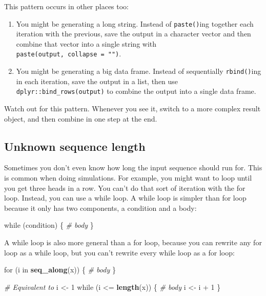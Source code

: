 \documentclass[]{book}
\newenvironment{Shaded}{\begin{snugshade}}{\end{snugshade}}
\newcommand{\KeywordTok}[1]{\textcolor[rgb]{0.13,0.29,0.53}{\textbf{{#1}}}}
\newcommand{\DecValTok}[1]{\textcolor[rgb]{0.00,0.00,0.81}{{#1}}}
\newcommand{\StringTok}[1]{\textcolor[rgb]{0.31,0.60,0.02}{{#1}}}
\newcommand{\CommentTok}[1]{\textcolor[rgb]{0.56,0.35,0.01}{\textit{{#1}}}}
\newcommand{\NormalTok}[1]{{#1}}
\begin{document}
This pattern occurs in other places too:

\begin{enumerate}
\def\labelenumi{\arabic{enumi}.}
\item
  You might be generating a long string. Instead of \texttt{paste()}ing
  together each iteration with the previous, save the output in a
  character vector and then combine that vector into a single string
  with \texttt{paste(output,\ collapse\ =\ "")}.
\item
  You might be generating a big data frame. Instead of sequentially
  \texttt{rbind()}ing in each iteration, save the output in a list, then
  use \texttt{dplyr::bind\_rows(output)} to combine the output into a
  single data frame.
\end{enumerate}

Watch out for this pattern. Whenever you see it, switch to a more
complex result object, and then combine in one step at the end.

\subsection{Unknown sequence length}\label{unknown-sequence-length}

Sometimes you don't even know how long the input sequence should run
for. This is common when doing simulations. For example, you might want
to loop until you get three heads in a row. You can't do that sort of
iteration with the for loop. Instead, you can use a while loop. A while
loop is simpler than for loop because it only has two components, a
condition and a body:

\begin{Shaded}
\begin{Highlighting}[]
\NormalTok{while (condition) \{}
  \CommentTok{# body}
\NormalTok{\}}
\end{Highlighting}
\end{Shaded}

A while loop is also more general than a for loop, because you can
rewrite any for loop as a while loop, but you can't rewrite every while
loop as a for loop:

\begin{Shaded}
\begin{Highlighting}[]
\NormalTok{for (i in }\KeywordTok{seq_along}\NormalTok{(x)) \{}
  \CommentTok{# body}
\NormalTok{\}}

\CommentTok{# Equivalent to}
\NormalTok{i <-}\StringTok{ }\DecValTok{1}
\NormalTok{while (i <=}\StringTok{ }\KeywordTok{length}\NormalTok{(x)) \{}
  \CommentTok{# body}
  \NormalTok{i <-}\StringTok{ }\NormalTok{i +}\StringTok{ }\DecValTok{1} 
\NormalTok{\}}
\end{Highlighting}
\end{Shaded}
\end{document}
